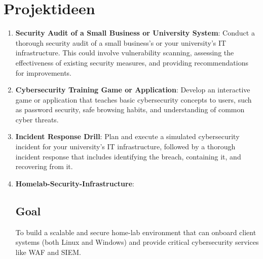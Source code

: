 \documentclass{article}
\begin{document}
	\section*{Projektideen}
	\begin{enumerate}
		\item \textbf{Security Audit of a Small Business or University System}: Conduct a thorough security audit of a small business's or your university's IT infrastructure. This could involve vulnerability scanning, assessing the effectiveness of existing security measures, and providing recommendations for improvements.\\
		\item \textbf{Cybersecurity Training Game or Application}: Develop an interactive game or application that teaches basic cybersecurity concepts to users, such as password security, safe browsing habits, and understanding of common cyber threats.\\
		\item \textbf{Incident Response Drill}: Plan and execute a simulated cybersecurity incident for your university's IT infrastructure, followed by a thorough incident response that includes identifying the breach, containing it, and recovering from it.
		
		\pagebreak
		
		\item \textbf{Homelab-Security-Infrastructure}:
		\subsection*{Goal}
		
		To build a scalable and secure home-lab environment that can onboard client systems (both Linux and Windows) and provide critical cybersecurity services like WAF and SIEM.\\
		

\end{enumerate}
\end{document}
